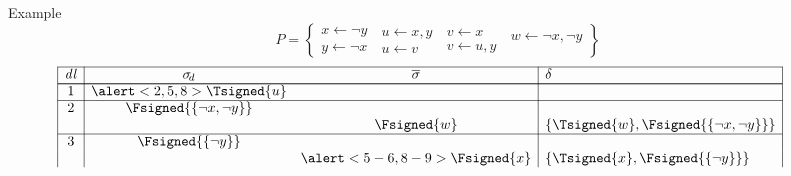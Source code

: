 \begin{frame}[shrink=0]{Example}
  \[
    P
    =
    \left\{
      \begin{array}{l}
        x  \leftarrow  \neg y\\
        y  \leftarrow  \neg x
      \end{array}
      \
      \begin{array}{l}
        u  \leftarrow x,y\\
        u  \leftarrow v
      \end{array}
      \
      \begin{array}{l}
        v  \leftarrow x\\
        v  \leftarrow u,y
      \end{array}
      \
      \begin{array}{l}
        w  \leftarrow \neg x,\neg y\\
        \mbox{~}
      \end{array}
    \right\}
  \]
  \medskip\footnotesize
  \[
    \begin{array}{|c|cc|l|p{5pt}l}
      \cline{1-4}
      \mathit{dl}&\sigma_{\!d}                              &\overline{\sigma}                   &\delta                                                                                            &          &
      \\\cline{1-4}\cline{1-4}
      1          &\alert<2,5,8>{\Tsigned{u}                }&                                    &                                                                                                  &          &
      \\\cline{1-4}
      2          &              \Fsigned{\{\neg x,\neg y\}} &                                    &                                                                                                  &          &
      \\
                 &                                          &                \Fsigned{w}         &\{\Tsigned{w},\Fsigned{\{\neg x,\neg y\}}\}                                                       &          &
      \\\cline{1-4}
      3          &              \Fsigned{\{\neg y\}}        &                                    &                                                                                                  &          &
      \\
                 &                                          &\alert<5-6,8-9>{\Fsigned{x}}        &\{\Tsigned{x},\Fsigned{\{\neg y\}}\}                                                              &          &

\end{array}\]
\end{frame}

